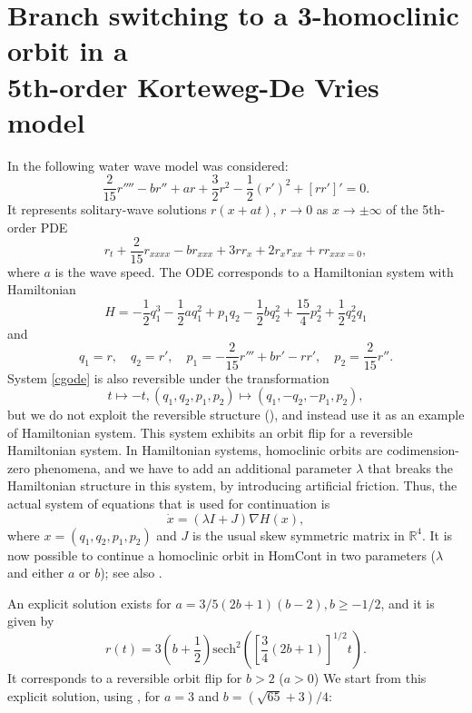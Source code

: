 \section{ Branch switching to a 3-homoclinic orbit in
a\\ 5th-order Korteweg-De Vries model}

In  the following water wave model was considered:
\begin{equation}
\frac{2}{15}r''''-b r''+ar+\frac{3}{2}r^2-
\frac{1}{2}(r')^2+[rr']' = 0.
\label{cgode}
\end{equation}
It represents solitary-wave solutions $r(x+at)$, $r\to 0$ as $x\to
\pm\infty$ of the 5th-order PDE
\[
r_t+\frac{2}{15}r_{xxxx}-b r_{xxx}+3r r_x+2 r_x r_{xx}+r r_{xxx=0},
\]
where $a$ is the wave speed.
The ODE corresponds to a Hamiltonian system with Hamiltonian
\[ H=-\frac{1}{2}q_1^3-\frac{1}{2}a q_1^2+p_1 q_2-\frac{1}{2}b q_2^2+
\frac{15}{4}p_2^2+\frac{1}{2}q_2^2 q_1 \]
and 
\[q_1=r, \quad q_2=r', \quad p_1=-\frac{2}{15}r'''+br'-rr', \quad p_2=\frac{2}{15}r''.\]
System \eqref{cgode} is also reversible under the transformation 
\[ t \mapsto -t, (q_1,q_2,p_1,p_2)\mapsto (q_1,-q_2,-p_1,p_2),\] 
but we do not exploit the reversible structure (), and
instead use it as an example of Hamiltonian system.
This system exhibits an orbit flip for a reversible Hamiltonian system.
In Hamiltonian systems, homoclinic orbits are codimension-zero
phenomena, and we have to add an additional parameter $\lambda$ that breaks
the Hamiltonian structure in this system, by introducing artificial friction.
Thus, the actual system of equations that is
used for continuation is
\[\dot x=(\lambda I + J)\nabla H(x),\]
where $x=(q_1,q_2,p_1,p_2)$ and $J$ is the usual skew symmetric matrix
in $\mathbb{R}^4$.
It is now possible to continue a homoclinic orbit in {\cal HomCont} in two
parameters ($\lambda$ and either $a$ or $b$); see also
.

An explicit solution exists for $a=3/5(2b+1)(b-2), b\geq -1/2$, and it is
given by 
\[r(t)=3(b+\frac{1}{2})\mathrm{sech}^2\left([\frac{3}{4}(2b+1)]^{1/2}t\right).\]
It corresponds to a reversible orbit flip for $b>2$ ($a>0$) 
We start from this explicit solution, using , for $a=3$ and
$b=(\sqrt{65}+3)/4$:

